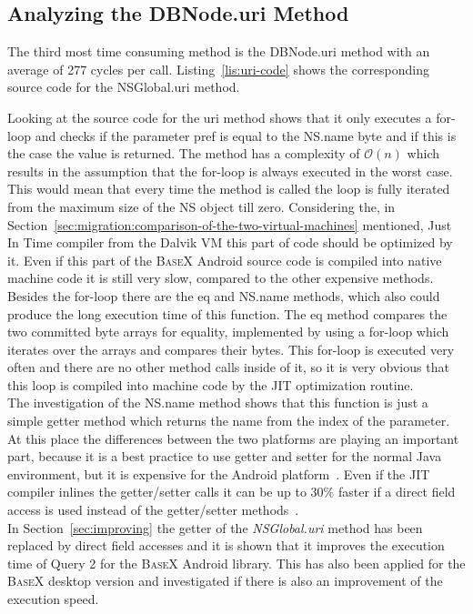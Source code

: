 \subsection*{Analyzing the \textsf{DBNode.uri} Method}
\label{sec:analyzing-the-dbnode.uri-method}
The third most time consuming method is the \textsf{DBNode.uri} method with an average of 277 cycles per call.
Listing~\ref{lis:uri-code} shows the corresponding source code for the \textsf{NSGlobal.uri} method.
		
Looking at the source code for the \textsf{uri} method shows that it only executes a for-loop and checks if the parameter \textsf{pref} is equal to the \textsf{NS.name} byte and if this is the case the value is returned.
The method has a complexity of $\mathcal O(n)$ which results in the assumption that the for-loop is always executed in the worst case.
This would mean that every time the method is called the loop is fully iterated from the maximum size of the \textsf{NS} object till zero.
Considering the, in Section~\ref{sec:migration:comparison-of-the-two-virtual-machines} mentioned, Just In Time compiler from the Dalvik VM this part of code should be optimized by it.
Even if this part of the \textsc{BaseX} Android source code is compiled into native machine code it is still very slow, compared to the other expensive methods.
Besides the for-loop there are the \textsf{eq} and \textsf{NS.name} methods, which also could produce the long execution time of this function.
The \textsf{eq} method compares the two committed byte arrays for equality, implemented by using a for-loop which iterates over the arrays and compares their bytes.
This for-loop is executed very often and there are no other method calls inside of it, so it is very obvious that this loop is compiled into machine code by the JIT optimization routine.\\
The investigation of the \textsf{NS.name} method shows that this function is just a simple getter method which returns the name from the index of the parameter.\\
At this place the differences between the two platforms are playing an important part, because it is a best practice to use getter and setter for the normal Java environment, but it is expensive for the Android platform~\cite{toninievlautatingandroid}.
Even if the JIT compiler inlines the getter/setter calls it can be up to 30\% faster if a direct field access is used instead of the getter/setter methods~\cite{toninianalysis}.\\
In Section~\ref{sec:improving} the getter of the \textit{NSGlobal.uri} method has been replaced by direct field accesses and it is shown that it improves the execution time of Query 2 for the \textsc{BaseX} Android library.
This has also been applied for the \textsc{BaseX} desktop version and investigated if there is also an improvement of the execution speed.

